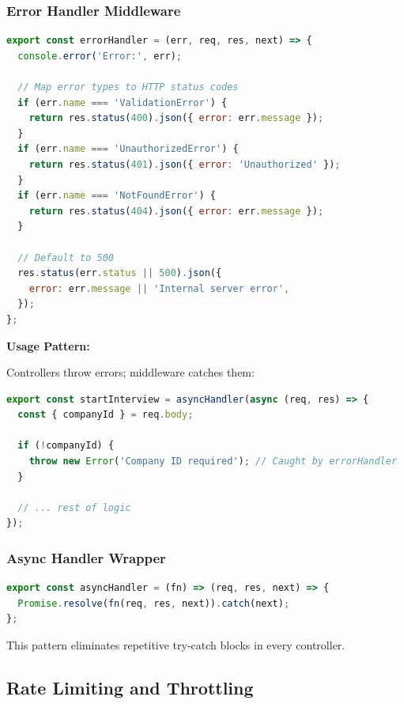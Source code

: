 \documentclass[12pt,a4paper,oneside]{article}
\begin{document}
\subsubsection{Error Handler Middleware}

\begin{lstlisting}[language=JavaScript, caption=Global Error Handling]
export const errorHandler = (err, req, res, next) => {
  console.error('Error:', err);

  // Map error types to HTTP status codes
  if (err.name === 'ValidationError') {
    return res.status(400).json({ error: err.message });
  }
  if (err.name === 'UnauthorizedError') {
    return res.status(401).json({ error: 'Unauthorized' });
  }
  if (err.name === 'NotFoundError') {
    return res.status(404).json({ error: err.message });
  }

  // Default to 500
  res.status(err.status || 500).json({
    error: err.message || 'Internal server error',
  });
};
\end{lstlisting}

\textbf{Usage Pattern:}

Controllers throw errors; middleware catches them:

\begin{lstlisting}[language=JavaScript, caption=Error Throwing in Controllers]
export const startInterview = asyncHandler(async (req, res) => {
  const { companyId } = req.body;
  
  if (!companyId) {
    throw new Error('Company ID required'); // Caught by errorHandler
  }
  
  // ... rest of logic
});
\end{lstlisting}

\subsubsection{Async Handler Wrapper}

\begin{lstlisting}[language=JavaScript, caption=Eliminate Try-Catch Boilerplate]
export const asyncHandler = (fn) => (req, res, next) => {
  Promise.resolve(fn(req, res, next)).catch(next);
};
\end{lstlisting}

This pattern eliminates repetitive try-catch blocks in every controller.

\subsection{Rate Limiting and Throttling}
\end{document}
